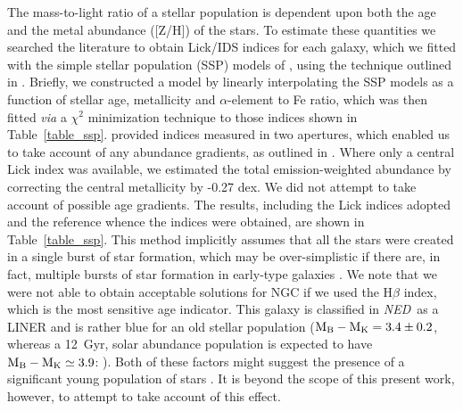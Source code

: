 \documentclass{emulateapj}
\def \eg {e.g.}
\newcommand{\ned}{{\em{NED}}}
\newcommand{\thin}{\thinspace}
\begin{document}
The mass-to-light ratio of a stellar population is dependent upon both the
age and the metal abundance ([Z/H]) of the stars. To estimate these 
quantities  we searched the literature
to obtain Lick/IDS indices for each galaxy, which we fitted with
the simple stellar population (SSP) models of \citet{thomas03a}, using the
technique outlined in \citet{humphrey05a}. Briefly, we constructed 
a model by linearly interpolating the SSP models as a function of 
stellar age, metallicity and $\alpha$-element to Fe ratio, which was
then fitted {\em via} a $\chi^2$ minimization technique to 
those indices shown in Table~\ref{table_ssp}. \citet{trager00a} provided
indices measured in two apertures, which enabled us to take account 
of any abundance gradients, as outlined in \citet{humphrey05a}.
Where only a central Lick index was available, we estimated the total
emission-weighted abundance by correcting the central metallicity by
-0.27 dex. We did not attempt to take account of possible age gradients. 
The results, including the 
Lick indices adopted and the reference whence the indices were obtained,
are shown in Table~\ref{table_ssp}. 
This method implicitly assumes that all the 
stars were created in a single burst of star formation, which may
be over-simplistic if there are, in fact, multiple bursts of star 
formation in early-type galaxies \citep[\eg][]{rembold05a,nolan06a}.
We note that we were not able to obtain acceptable solutions for 
NGC\thin 6482 if we used the H$\beta$ index, which is the most sensitive
age indicator. This galaxy is classified in \ned\ as a LINER
and is rather blue for an old stellar population 
(${\rm M_B-M_K=3.4\pm0.2}$, whereas a 12~Gyr, solar abundance population is 
expected to have ${\rm M_B-M_K\simeq3.9}$: \citealt{maraston98a}).
Both of these factors might suggest the presence of a significant young
population of stars \citep[although see][]{cidfernandes04a}. 
It is beyond the scope of this present work, however,
to attempt to take account of this effect.



%

\end{document}

